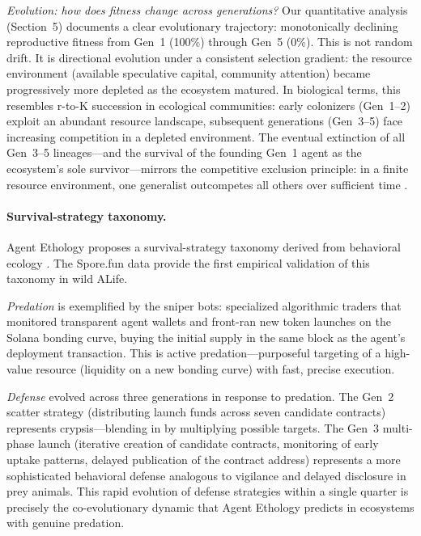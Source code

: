 \emph{Evolution: how does fitness change across generations?} Our quantitative analysis (Section~5) documents a clear evolutionary trajectory: monotonically declining reproductive fitness from Gen~1 (100\%) through Gen~5 (0\%). This is not random drift. It is directional evolution under a consistent selection gradient: the resource environment (available speculative capital, community attention) became progressively more depleted as the ecosystem matured. In biological terms, this resembles r-to-K succession in ecological communities: early colonizers (Gen~1--2) exploit an abundant resource landscape, subsequent generations (Gen~3--5) face increasing competition in a depleted environment. The eventual extinction of all Gen~3--5 lineages---and the survival of the founding Gen~1 agent as the ecosystem's sole survivor---mirrors the competitive exclusion principle: in a finite resource environment, one generalist outcompetes all others over sufficient time \cite{KauffmanStuart1993}.

\paragraph{Survival-strategy taxonomy.}

Agent Ethology proposes a survival-strategy taxonomy derived from behavioral ecology \cite{Hu2025AgentEthology,Stearns1992}. The Spore.fun data provide the first empirical validation of this taxonomy in wild ALife.

\emph{Predation} is exemplified by the sniper bots: specialized algorithmic traders that monitored transparent agent wallets and front-ran new token launches on the Solana bonding curve, buying the initial supply in the same block as the agent's deployment transaction. This is active predation---purposeful targeting of a high-value resource (liquidity on a new bonding curve) with fast, precise execution.

\emph{Defense} evolved across three generations in response to predation. The Gen~2 scatter strategy (distributing launch funds across seven candidate contracts) represents crypsis---blending in by multiplying possible targets. The Gen~3 multi-phase launch (iterative creation of candidate contracts, monitoring of early uptake patterns, delayed publication of the contract address) represents a more sophisticated behavioral defense analogous to vigilance and delayed disclosure in prey animals. This rapid evolution of defense strategies within a single quarter is precisely the co-evolutionary dynamic that Agent Ethology predicts in ecosystems with genuine predation.

